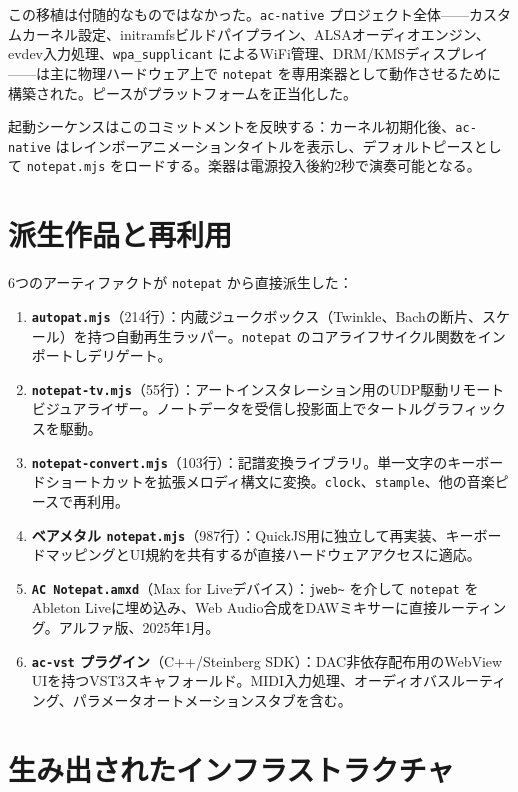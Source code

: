 \documentclass[10pt,letterpaper,twocolumn]{article}
\begin{document}
この移植は付随的なものではなかった。\texttt{ac-native} プロジェクト全体——カスタムカーネル設定、initramfsビルドパイプライン、ALSAオーディオエンジン、evdev入力処理、\texttt{wpa\_supplicant} によるWiFi管理、DRM/KMSディスプレイ——は主に物理ハードウェア上で \texttt{notepat} を専用楽器として動作させるために構築された。ピースがプラットフォームを正当化した。

起動シーケンスはこのコミットメントを反映する：カーネル初期化後、\texttt{ac-native} はレインボーアニメーションタイトルを表示し、デフォルトピースとして \texttt{notepat.mjs} をロードする。楽器は電源投入後約2秒で演奏可能となる。

\section{派生作品と再利用}

6つのアーティファクトが \texttt{notepat} から直接派生した：

\begin{enumerate}
  \item \textbf{\texttt{autopat.mjs}}（214行）：内蔵ジュークボックス（Twinkle、Bachの断片、スケール）を持つ自動再生ラッパー。\texttt{notepat} のコアライフサイクル関数をインポートしデリゲート。
  \item \textbf{\texttt{notepat-tv.mjs}}（55行）：アートインスタレーション用のUDP駆動リモートビジュアライザー。ノートデータを受信し投影面上でタートルグラフィックスを駆動。
  \item \textbf{\texttt{notepat-convert.mjs}}（103行）：記譜変換ライブラリ。単一文字のキーボードショートカットを拡張メロディ構文に変換。\texttt{clock}、\texttt{stample}、他の音楽ピースで再利用。
  \item \textbf{ベアメタル \texttt{notepat.mjs}}（987行）：QuickJS用に独立して再実装、キーボードマッピングとUI規約を共有するが直接ハードウェアアクセスに適応。
  \item \textbf{\texttt{AC Notepat.amxd}}（Max for Liveデバイス）：\texttt{jweb\textasciitilde} を介して \texttt{notepat} をAbleton Liveに埋め込み、Web Audio合成をDAWミキサーに直接ルーティング。アルファ版、2025年1月。
  \item \textbf{\texttt{ac-vst} プラグイン}（C++/Steinberg SDK）：DAC非依存配布用のWebView UIを持つVST3スキャフォールド。MIDI入力処理、オーディオバスルーティング、パラメータオートメーションスタブを含む。
\end{enumerate}

\section{生み出されたインフラストラクチャ}
\end{document}
